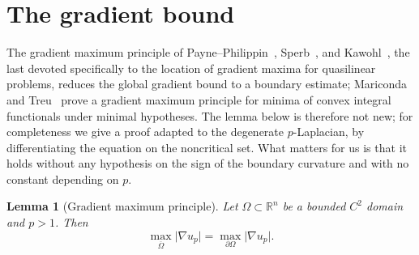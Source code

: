 \documentclass[11pt]{article}
\newcommand{\R}{\mathbb R}
\newcommand{\abs}[1]{\lvert #1\rvert}
\newtheorem{lemma}[theorem]{Lemma}
\theoremstyle{definition}
\theoremstyle{remark}
\begin{document}
\section{The gradient bound}\label{sec:gradient-bound}
The gradient maximum principle of Payne--Philippin~\cite{PP},
Sperb~\cite{Sperb}, and Kawohl~\cite{Kaw1987}, the last devoted specifically
to the location of gradient maxima for quasilinear problems, reduces the
global gradient bound to a boundary estimate; Mariconda and Treu~\cite{MT}
prove a gradient maximum principle for minima of convex integral functionals
under minimal hypotheses. The lemma below is therefore not new; for
completeness we give a proof adapted to the degenerate $p$-Laplacian, by
differentiating the equation on the noncritical set. What matters for us is
that it holds without any hypothesis on the sign of the boundary curvature and
with no constant depending on $p$.
\begin{lemma}[Gradient maximum principle]\label{lem:grad-max}
Let $\Omega\subset\R^n$ be a bounded $C^2$ domain and $p>1$. Then
\begin{equation}\label{eq:grad-max}
\max_{\overline\Omega}\abs{\nabla u_p}=\max_{\partial\Omega}\abs{\nabla u_p}.
\end{equation}
\end{lemma}
\end{document}
